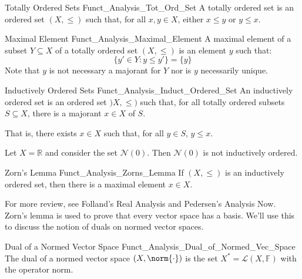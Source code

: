         \begin{ldefinition}{Totally Ordered Sets}
              {Funct_Analysis_Tot_Ord_Set}
            A totally ordered set is an ordered set
            $(X,\leq)$ such that, for all $x,y\in{X}$, either
            $x\leq{y}$ or $y\leq{x}$.
        \end{ldefinition}
        \begin{ldefinition}{Maximal Element}
              {Funct_Analysis_Maximal_Element}
            A maximal element of a subset $Y\subseteq{X}$ of
            a totally ordered set $(X,\leq)$ is an element $y$
            such that:
            \begin{equation}
                \{y'\in{Y}:y\leq{y}'\}=\{y\}
            \end{equation}
            Note that $y$ is not necessary a majorant for $Y$
            nor is $y$ necessarily unique.
        \end{ldefinition}
        \begin{ldefinition}{Inductively Ordered Sets}
              {Funct_Analysis_Induct_Ordered_Set}
            An inductively ordered set is an ordered set
            $)X,\leq)$ such that, for all totally ordered
            subsets $S\subseteq{X}$, there is a majorant
            $x\in{X}$ of $S$.
        \end{ldefinition}
        That is, there exists $x\in{X}$ such that, for all
        $y\in{S}$, $y\leq{x}$.
        \begin{lexample}
            Let $X=\mathbb{R}$ and consider the set
            $\mathscr{N}(0)$. Then $\mathscr{N}(0)$ is
            not inductively ordered.
        \end{lexample}
        \begin{ltheorem}{Zorn's Lemma}
              {Funct_Analysis_Zorns_Lemma}
            If $(X,\leq)$ is an inductively ordered set,
            then there is a maximal element $x\in{X}$.
        \end{ltheorem}
        For more review, see Folland's Real Analysis and
        Pedersen's Analysis Now. Zorn's lemma is used to
        prove that every vector space has a basis. We'll
        use this to discuss the notion of duals on
        normed vector spaces.
        \begin{ldefinition}{Dual of a Normed Vector Space}
              {Funct_Analysis_Dual_of_Normed_Vec_Space}
            The dual of a normed vector space $(X,\norm{\cdot})$
            is the set $X^{*}=\mathcal{L}(X,\mathbb{F})$
            with the operator norm.
        \end{ldefinition}
